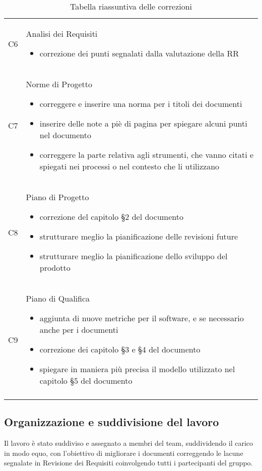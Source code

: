\begin{center}
\begin{longtable}{  p{3cm} p{11.2cm}  }
				\\
				C6 & 		Analisi dei Requisiti
								\begin{itemize}
									\item correzione dei punti segnalati dalla valutazione della RR
								\end{itemize}
				\\
				C7 & 		Norme di Progetto
								\begin{itemize}
									\item correggere e inserire una norma per i titoli dei documenti
									\item inserire delle note a piè di pagina per spiegare alcuni punti nel documento
									\item correggere la parte relativa agli strumenti, che vanno citati e spiegati nei processi o nel contesto che li utilizzano
								\end{itemize}
				\\
				C8 & 		Piano di Progetto
								\begin{itemize}
									\item correzione del capitolo §2 del documento
									\item strutturare meglio la pianificazione delle revisioni future
									\item strutturare meglio la pianificazione dello sviluppo del prodotto
								\end{itemize}
				\\
				C9 & 		Piano di Qualifica
								\begin{itemize}
									\item aggiunta di nuove metriche per il software, e se necessario anche per i documenti
									\item correzione dei capitolo §3 e §4 del documento
									\item spiegare in maniera più precisa il modello utilizzato nel capitolo §5 del documento
								\end{itemize}
				\\
				
				\rowcolor{white}
				\caption{Tabella riassuntiva delle correzioni}
			\end{longtable}	
		\end{center}
	
\clearpage
	\subsection{Organizzazione e suddivisione del lavoro}
	Il lavoro è stato suddiviso e assegnato a membri del team, suddividendo il carico in modo equo, con l'obiettivo di migliorare i documenti correggendo le lacune segnalate in Revisione dei Requisiti coinvolgendo tutti i partecipanti del gruppo.

